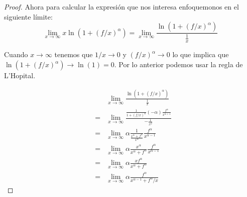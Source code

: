 \documentclass[letter,twoside,12pt]{article}
\numberwithin{equation}{section}
\begin{document}
\begin{enumerate}[label = (\textbf{\arabic*.})]
\begin{proof}
%

Ahora para calcular la expresión que nos interesa enfoquemonos en el siguiente límite:
\begin{equation}
\lim_{x \to \infty} x\ln(1+(f/x)^\alpha) 
= \lim_{x \to \infty} \frac{\ln(1+(f/x)^\alpha)}{\frac{1}{x}} \nonumber
\end{equation}

Cuando $ x \to \infty $ tenemos que $ 1/x \to 0 $ y $ (f/x)^\alpha \to 0 $ lo que implica que $ \ln(1+(f/x)^\alpha) \to \ln(1) = 0 $. Por lo anterior podemos usar la regla de L'Hopital.

\begin{eqnarray}
& & \lim_{x \to \infty} \frac{\ln(1+(f/x)^\alpha)}{\frac{1}{x}} \nonumber
\\ &=& \lim_{x \to \infty} \frac{\frac{1}{1+(f/x)^\alpha}(-\alpha)\frac{f^\alpha}{x^{\alpha+1}}}{-\frac{1}{x^2}} \nonumber
\\ &=& \lim_{x \to \infty} \alpha\frac{1}{\frac{x^{\alpha}+f^\alpha}{x^\alpha}}\frac{f^\alpha}{x^{\alpha-1}} \nonumber
\\ &=& \lim_{x \to \infty} \alpha\frac{x^\alpha}{x^{\alpha}+f^\alpha}\frac{f^\alpha}{x^{\alpha-1}} \nonumber
\\ &=& \lim_{x \to \infty} \alpha\frac{xf^\alpha}{x^{\alpha}+f^\alpha} \nonumber
\\ &=& \lim_{x \to \infty} \alpha\frac{f^\alpha}{x^{\alpha-1}+f^\alpha/x} \nonumber
\end{eqnarray}


\end{proof}
\end{enumerate}
\end{document}
